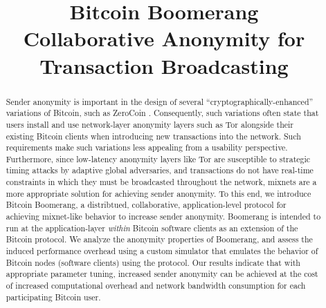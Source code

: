 \documentclass[conference]{IEEEtran}
\begin{document}
\title{Bitcoin Boomerang \\ {\LARGE Collaborative Anonymity for Transaction Broadcasting}}

\author{
\and
{}
}

\maketitle

\begin{abstract}
Sender anonymity is important in the design of several ``cryptographically-enhanced'' variations of Bitcoin, such as ZeroCoin \cite{zerocoin}. Consequently, such variations often state that users install and use network-layer anonymity layers such as Tor \cite{tor} alongside their existing Bitcoin clients when introducing new transactions into the network. Such requirements make such variations less appealing from a usability perspective. Furthermore, since low-latency anonymity layers like Tor are susceptible to strategic timing attacks by adaptive global adversaries, and transactions do not have real-time constraints in which they must be broadcasted throughout the network, mixnets are a more appropriate solution for achieving sender anonymity. To this end, we introduce Bitcoin Boomerang, a distribtued, collaborative, application-level protocol for achieving mixnet-like behavior to increase sender anonymity. Boomerang is intended to run at the application-layer \emph{within} Bitcoin software clients as an extension of the Bitcoin protocol. We analyze the anonymity properties of Boomerang, and assess the induced performance overhead using a custom simulator that emulates the behavior of Bitcoin nodes (software clients) using the protocol. Our results indicate that with appropriate parameter tuning, increased sender anonymity can be achieved at the cost of increased computational overhead and network bandwidth consumption for each participating Bitcoin user.
\end{abstract}

\IEEEpeerreviewmaketitle
\end{document}
